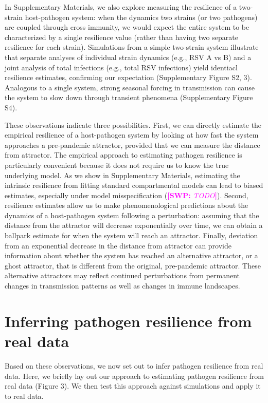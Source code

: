 \documentclass[12pt]{article}
\newcommand{\comment}{\showcomment}
\newcommand{\showcomment}[3]{\textcolor{#1}{\textbf{[#2: }\textsl{#3}\textbf{]}}}
\newcommand{\swp}[1]{\comment{magenta}{SWP}{#1}}
\begin{document}
In Supplementary Materials, we also explore measuring the resilience of a two-strain host-pathogen system:
when the dynamics two strains (or two pathogens) are coupled through cross immunity, we would expect the entire system to be characterized by a single resilience value (rather than having two separate resilience for each strain).
Simulations from a simple two-strain system illustrate that separate analyses of individual strain dynamics (e.g., RSV A vs B) and a joint analysis of total infections (e.g., total RSV infections) yield identiacl resilience estimates, confirming our expectation (Supplementary Figure S2, 3).
Analogous to a single system, strong seasonal forcing in transmission can cause the system to slow down through transient phenomena (Supplementary Figure S4).

These observations indicate three possibilities.
First, we can directly estimate the empirical resilience of a host-pathogen system by looking at how fast the system approaches a pre-pandemic attractor, provided that we can measure the distance from attractor.
The empirical approach to estimating pathogen resilience is particularly convenient because it does not require us to know the true underlying model.
As we show in Supplementary Materials, estimating the intrinsic resilience from fitting standard compartmental models can lead to biased estimates, especially under model misspecification (\swp{TODO}).
Second, resilience estimates allow us to make phenomenological predictions about the dynamics of a host-pathogen system following a perturbation:
assuming that the distance from the attractor will decrease exponentially over time, we can obtain a ballpark estimate for when the system will reach an attractor.
Finally, deviation from an exponential decrease in the distance from attractor can provide information about whether the system has reached an alternative attractor, or a ghost attractor, that is different from the original, pre-pandemic attractor.
These alternative attractors may reflect continued perturbations from permanent changes in transmission patterns as well as changes in immune landscapes.

\section*{Inferring pathogen resilience from real data}

Based on these observations, we now set out to infer pathogen resilience from real data.
Here, we briefly lay out our approach to estimating pathogen resilience from real data (Figure 3).
We then test this approach against simulations and apply it to real data.
\end{document}
